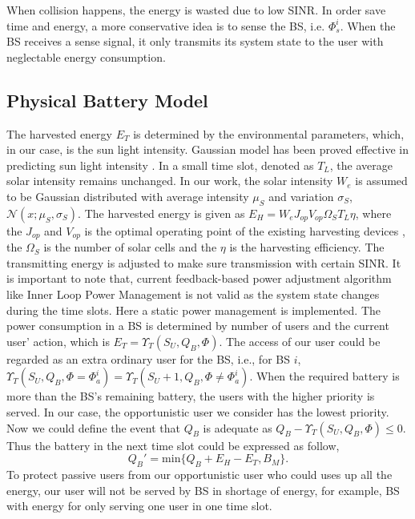 \documentclass[conference]{IEEEtran}
\begin{document}
When collision happens, the energy is wasted due to low SINR.
In order save time and energy, a more conservative idea is to sense the BS, i.e. \(\Phi_{s}^i\).
When the BS receives a sense signal,
it only transmits its system state to the user with neglectable energy consumption.
\subsection{Physical Battery Model}
The harvested energy \(E_T\) is determined by the environmental parameters,
which, in our case, is the sun light intensity.
Gaussian model has been proved effective in predicting sun light intensity \cite{gaussian,data}.
In a small time slot, denoted as \(T_L\), the average solar intensity remains unchanged.
In our work, the solar intensity \(W_e\) is assumed to be
Gaussian distributed with average intensity \(\mu_S\) and variation \(\sigma_S\), \(\mathcal{N}\left(x;\mu_S,\sigma_S\right)\).
The harvested energy is given as \(E_H = W_eJ_{op}V_{op}\Omega_ST_L\eta\),
where the \(J_{op}\) and \(V_{op}\) is the optimal operating point of the existing harvesting devices \cite{physic},
the \(\Omega_S\) is the number of solar cells and the \(\eta\) is the harvesting efficiency.
The transmitting energy is adjusted to make sure transmission with certain SINR.
It is important to note that, current feedback-based power adjustment algorithm
like Inner Loop Power Management is not valid as the system state changes during the time slots.
Here a static power management is implemented.
The power consumption in a BS is determined by number of users and the current user' action,
which is \(E_T = \Upsilon_T(S_U, Q_B, \Phi)\).
The access of our user could be regarded as an extra ordinary user for the BS, i.e., for BS \(i\),
\(\Upsilon_T(S_U, Q_B, \Phi = \Phi_{a}^{i}) = \Upsilon_T(S_U + 1, Q_B, \Phi \ne \Phi_{a}^i)\).
When the required battery is more than the BS's remaining battery,
the users with the higher priority is served.
In our case, the opportunistic user we consider has the lowest priority.
Now we could define the event that \(Q_B\) is adequate as \(Q_B- \Upsilon_T(S_U, Q_B, \Phi) \leq 0\).
Thus the battery in the next time slot could be expressed as follow,
\begin{equation}
	Q_B' = \mbox{min}\{Q_B + E_H - E_T, B_M\}.
\end{equation}
To protect passive users from our opportunistic user who could
uses up all the energy, our user will not be served by BS in shortage of energy,
for example, BS with energy for only serving one user in one time slot.
\end{document}
